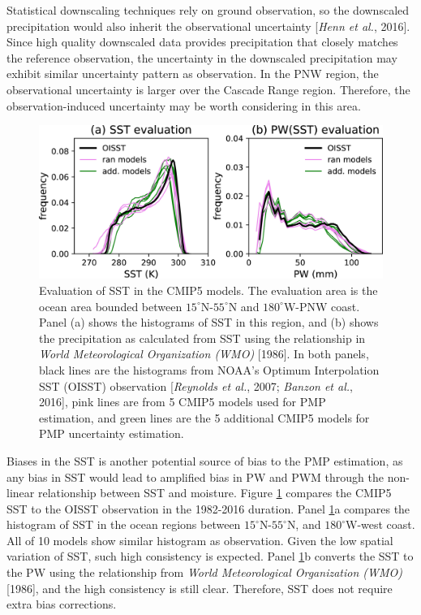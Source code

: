 Statistical downscaling techniques rely on ground observation, so the downscaled precipitation would also inherit the observational uncertainty [\textit{Henn et al.}, 2016]. Since high quality downscaled data provides precipitation that closely matches the reference observation, the uncertainty in the downscaled precipitation may exhibit similar uncertainty pattern as observation. In the PNW region, the observational uncertainty is larger over the Cascade Range region. Therefore, the observation-induced uncertainty may be worth considering in this area.

\begin{figure}[htbp]
	\includegraphics[width=\linewidth]{pics/ch5/fig15.jpg}
	\caption{Evaluation of SST in the CMIP5 models. The evaluation area is the ocean area bounded between $15^{\circ}$N-$55^{\circ}$N and $180^{\circ}$W-PNW coast. Panel (a) shows the histograms of SST in this region, and (b) shows the precipitation as calculated from SST using the relationship in \textit{World Meteorological Organization (WMO)} [1986]. In both panels, black lines are the histograms from NOAA’s Optimum Interpolation SST (OISST) observation [\textit{Reynolds et al.}, 2007; \textit{Banzon et al.}, 2016], pink lines are from 5 CMIP5 models used for PMP estimation, and green lines are the 5 additional CMIP5 models for PMP uncertainty estimation.}
	\label{fig:5-15}
\end{figure}


Biases in the SST is another potential source of bias to the PMP estimation, as any bias in SST would lead to amplified bias in PW and PWM through the non-linear relationship between SST and moisture. Figure \ref{fig:5-15} compares the CMIP5 SST to the OISST observation in the 1982-2016 duration. Panel \ref{fig:5-15}a compares the histogram of SST in the ocean regions between $15^{\circ}$N-$55^{\circ}$N, and $180^{\circ}$W-west coast. All of 10 models show similar histogram as observation. Given the low spatial variation of SST, such high consistency is expected. Panel \ref{fig:5-15}b converts the SST to the PW using the relationship from \textit{World Meteorological Organization (WMO)} [1986], and the high consistency is still clear. Therefore, SST does not require extra bias corrections.

